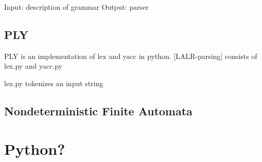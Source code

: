 Input: description of grammar \cite{LexYacc.1992}
Output: parser \cite{LexYacc.1992}


\subsection{PLY}\label{sec:BackgroundPLY}

\acf{PLY} \cite{PLY} is an implementation of lex and yacc in python.
[LALR-parsing]
consists of lex.py and yacc.py

lex.py tokenizes an input string


\subsection{Nondeterministic Finite Automata}\label{sec:BackgroundNDAutomata}

\section{Python?}\label{sec:BackgroundPython}